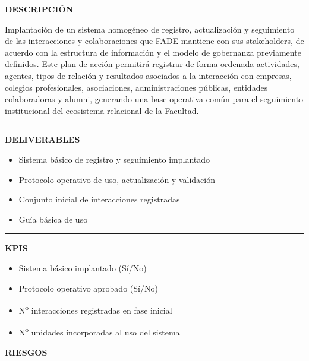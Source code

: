 \documentclass[11pt,a4paper]{scrreprt}
\newcommand{\fieldlabel}[1]{%
  {\footnotesize\sffamily\bfseries\color{mutedcolor}\MakeUppercase{#1}}\par\nopagebreak[4]
}
\newcommand{\fieldsep}{\vspace{3pt}\noindent\textcolor{bordercolor}{\rule{\linewidth}{0.4pt}}\vspace{3pt}\par}
\begin{document}
\begin{tcolorbox}[pabox={filcolor}{PA3.1 \enspace\textbullet\enspace Implantación del sistema de registro y seguimiento de interacciones y colaboraciones}]

\fieldlabel{Descripci\'on}
{\small Implantación de un sistema homogéneo de registro, actualización y seguimiento de las interacciones y colaboraciones que FADE mantiene con sus stakeholders, de acuerdo con la estructura de información y el modelo de gobernanza previamente definidos. Este plan de acción permitirá registrar de forma ordenada actividades, agentes, tipos de relación y resultados asociados a la interacción con empresas, colegios profesionales, asociaciones, administraciones públicas, entidades colaboradoras y alumni, generando una base operativa común para el seguimiento institucional del ecosistema relacional de la Facultad. }\par
\fieldsep
\fieldlabel{Deliverables}
{\small \begin{itemize}[noitemsep,topsep=2pt]
\item Sistema básico de registro y seguimiento implantado
\item Protocolo operativo de uso, actualización y validación
\item Conjunto inicial de interacciones registradas
\item Guía básica de uso
\end{itemize}}\par
\fieldsep
\fieldlabel{KPIs}
{\small \begin{itemize}[noitemsep,topsep=2pt]
\item Sistema básico implantado (Sí/No)
\item Protocolo operativo aprobado (Sí/No)
\item N\textsuperscript{o} interacciones registradas en fase inicial
\item N\textsuperscript{o} unidades incorporadas al uso del sistema
\end{itemize}}\par
\end{tcolorbox}
\begin{tcolorbox}[riskbox]
{\footnotesize\sffamily\bfseries\color{red!50!black} RIESGOS}\par{}
\end{tcolorbox}
\end{document}
